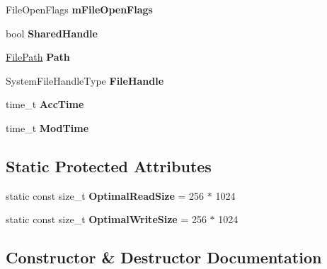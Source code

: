 \begin{DoxyCompactItemize}
File\+Open\+Flags {\bfseries m\+File\+Open\+Flags}
\item 
\mbox{\label{class_gost_crypt_1_1_file_a19e3663e18ce2ba723a24fb897dd428d}} 
bool {\bfseries Shared\+Handle}
\item 
\mbox{\label{class_gost_crypt_1_1_file_a955c3d80df34d0112497e42f78996965}} 
\hyperlink{class_gost_crypt_1_1_filesystem_path}{File\+Path} {\bfseries Path}
\item 
\mbox{\label{class_gost_crypt_1_1_file_a3490bd7fdac830b5453a6ef196aaa2a5}} 
System\+File\+Handle\+Type {\bfseries File\+Handle}
\item 
\mbox{\label{class_gost_crypt_1_1_file_a51831830db0d0b618af246a7c31ccedf}} 
time\+\_\+t {\bfseries Acc\+Time}
\item 
\mbox{\label{class_gost_crypt_1_1_file_a1c268a6f62ab9a3692c0a53ec01ca4c7}} 
time\+\_\+t {\bfseries Mod\+Time}
\end{DoxyCompactItemize}
\subsection*{Static Protected Attributes}
\begin{DoxyCompactItemize}
\item 
\mbox{\label{class_gost_crypt_1_1_file_acf5b61ab1244d16e7e0ebfb283d67e91}} 
static const size\+\_\+t {\bfseries Optimal\+Read\+Size} = 256 $\ast$ 1024
\item 
\mbox{\label{class_gost_crypt_1_1_file_a4e25a4422e5ab28e9285acec45429772}} 
static const size\+\_\+t {\bfseries Optimal\+Write\+Size} = 256 $\ast$ 1024
\end{DoxyCompactItemize}


\subsection{Constructor \& Destructor Documentation}
\mbox{\label{class_gost_crypt_1_1_file_abc79497e09b0c9600a229e1eb5edecad}} 
